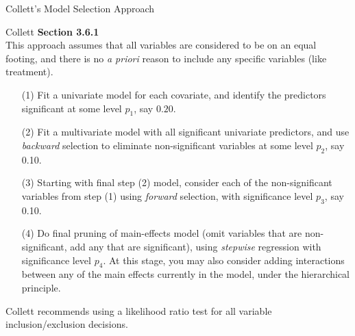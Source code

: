 \documentclass[envcountsect, 10pt, portrait, palatino]{beamer}
\begin{document}
\begin{frame}{Collett's Model Selection Approach}

Collett {\bf Section 3.6.1}
\\[2ex]
This approach assumes that all variables are considered to be on an
equal footing, and there is no {\em a priori} reason to include any
specific variables (like treatment).
\small
\begin{itemize}
\item[(1)] Fit a univariate model for each covariate, and identify the
predictors significant at some level $p_1$, say $0.20$.

\item[(2)] Fit a multivariate model with all significant univariate
predictors, and use {\em backward} selection to eliminate non-significant
variables at some level $p_2$, say 0.10.

\item[(3)] Starting with final step (2) model, consider each of
the non-significant variables from step (1) using
{\em forward} selection, with significance level $p_3$, say 0.10.

\item[(4)] Do final pruning of main-effects model (omit variables that
are non-significant, add any that are significant), using {\em stepwise}
regression with significance level $p_4$.  At this stage, you may also
consider adding interactions between any of the main effects currently
in the model, under the hierarchical principle.
\end{itemize}
\normalsize
Collett recommends using a likelihood ratio test for all variable
inclusion/exclusion decisions.
\end{frame}
\end{document}
